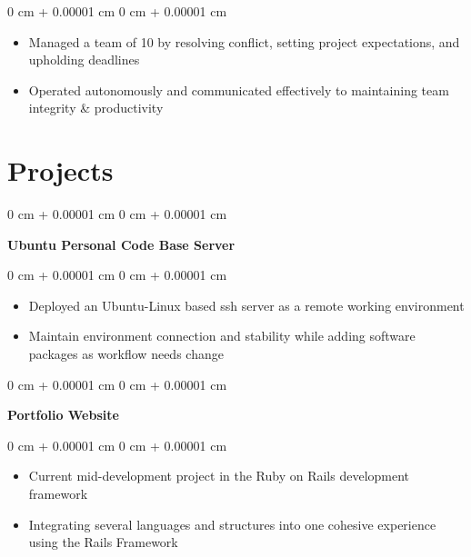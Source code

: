 \documentclass[10pt, letterpaper]{article}
\newenvironment{highlights}{
    \begin{itemize}[
        topsep=0.10 cm,
        parsep=0.10 cm,
        partopsep=0pt,
        itemsep=0pt,
        leftmargin=0 cm + 10pt
    ]
}{
    \end{itemize}
} %
\newenvironment{onecolentry}{
    \begin{adjustwidth}{
        0 cm + 0.00001 cm
    }{
        0 cm + 0.00001 cm
    }
}{
    \end{adjustwidth}
} %
\newenvironment{twocolentry}[2][]{
    \onecolentry%
    \def\secondColumn{#2}
    \setcolumnwidth{\fill, 6.0 cm}
    \begin{paracol}{2}
}{
    \switchcolumn\raggedleft\secondColumn%
    \end{paracol}
    \endonecolentry%
} %
\begin{document}
        \vspace{0.10 cm}
        \begin{onecolentry}
            \begin{highlights}
                \item Managed a team of 10 by resolving conflict, setting project expectations, and upholding deadlines
                \item Operated autonomously and communicated effectively to maintaining team integrity \& productivity
            \end{highlights}
        \end{onecolentry}
    
    {\color{secondaryColor}\section{Projects}}



        
        \begin{onecolentry}
            \textbf{Ubuntu Personal Code Base Server}
        \end{onecolentry}
            
        \vspace{0.10 cm}

        \begin{onecolentry}
            \begin{highlights}
                \item Deployed an Ubuntu-Linux based ssh server as a remote working environment
                \item Maintain environment connection and stability while adding software packages as workflow needs change
            \end{highlights}
        \end{onecolentry}



        \vspace{0.2 cm}

        \begin{twocolentry}{
            \href{https://github.com/thatchereames/website}{\color{secondaryColor}{github.com/thatchereames/website}}
        }
            \textbf{Portfolio Website}\end{twocolentry}

        \vspace{0.10 cm}
        \begin{onecolentry}
            \begin{highlights}
                \item Current mid-development project in the Ruby on Rails development framework
                \item Integrating several languages and structures into one cohesive experience using the Rails Framework
            \end{highlights}
        \end{onecolentry}
\end{document}
